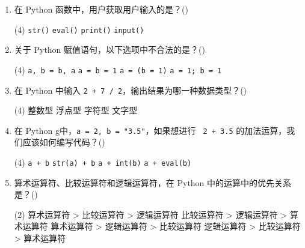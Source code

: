 \documentclass[11pt]{ctexart}
\begin{document}
\begin{enumerate}
        \item 在 Python 函数中，用户获取用户输入的是？(\qquad)
        \begin{tasks}(4)
            \task \lstinline{str()}
            \task \lstinline{eval()}
            \task \lstinline{print()}
            \task \lstinline{input()}
        \end{tasks}

        \item 关于 Python 赋值语句，以下选项中不合法的是？(\qquad)
        \begin{tasks}(4)
            \task \lstinline{a, b = b, a}
            \task \lstinline{a = b = 1}
            \task \lstinline{a = (b = 1)}
            \task \lstinline{a = 1; b = 1}
        \end{tasks}

        \item 在 Python 中输入 \lstinline{2 + 7 / 2}，输出结果为哪一种数据类型？(\qquad)
        \begin{tasks}(4)
            \task 整数型
            \task 浮点型
            \task 字符型
            \task 文字型
        \end{tasks}

        \item 在 Python g中，\lstinline{a = 2, b = "3.5"}，如果想进行 \lstinline{ 2 + 3.5} 的加法运算，我们应该如何编写代码？(\qquad)
        \begin{tasks}(4)
            \task \lstinline{a + b}
            \task \lstinline{str(a) + b}
            \task \lstinline{a + int(b)}
            \task \lstinline{a + eval(b)}
        \end{tasks}

        \item 算术运算符、比较运算符和逻辑运算符，在 Python 中的运算中的优先关系是？(\qquad)
        \begin{tasks}(2)
            \task 算术运算符 > 比较运算符 > 逻辑运算符
            \task 比较运算符 > 逻辑运算符 > 算术运算符
            \task 算术运算符 > 逻辑运算符 > 比较运算符
            \task 逻辑运算符 > 比较运算符 > 算术运算符
        \end{tasks}


\end{enumerate}
\end{document}
